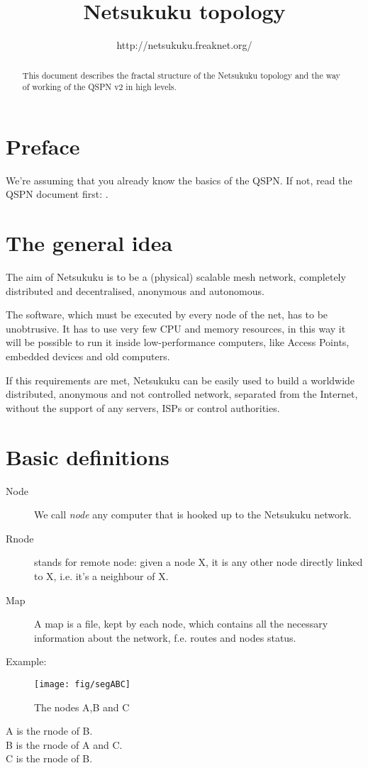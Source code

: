 \documentclass[a4paper]{article}
\title{Netsukuku topology}
\author{http://netsukuku.freaknet.org/}
\begin{document}
\maketitle

\begin{abstract}
	This document describes the fractal structure of the Netsukuku topology
	and the way of working of the QSPN v2 in high levels.
\end{abstract}

\section{Preface}
\label{sec:preface}

We're assuming that you already know the basics of the QSPN. If not, read the
QSPN document first: \cite{qspndoc}.

\section{The general idea}
\label{sec:general_idea}

The aim of Netsukuku is to be a (physical) scalable mesh network, completely
distributed and decentralised, anonymous and autonomous.

The software, which must be executed by every node of the net, has to be
unobtrusive. It has to use very few CPU and memory resources, in this way it
will be possible to run it inside low-performance computers, like Access Points,
embedded devices and old computers.

If this requirements are met, Netsukuku can be easily used to build a worldwide
distributed, anonymous and not controlled network, separated from the
Internet, without the support of any servers, ISPs or control authorities.

\section{Basic definitions}

\begin{description}
	\item[Node] We call \emph{node} any computer that is hooked up to the
		Netsukuku network.
	\item[Rnode] stands for remote node: given a node X, it is any other
		node directly linked to X, i.e. it's a neighbour of X.
	\item[Map] A map is a file, kept by each node, which contains all the
		necessary information about the network, f.e. routes and nodes
		status.
\end{description}
Example:\\
\begin{figure}[h]
	\begin{center}
		\texttt{[image: fig/segABC]}
	\end{center}
	\caption{The nodes A,B and C}
\end{figure}
A is the rnode of B.\\
B is the rnode of A and C.\\
C is the rnode of B.
\end{document}
